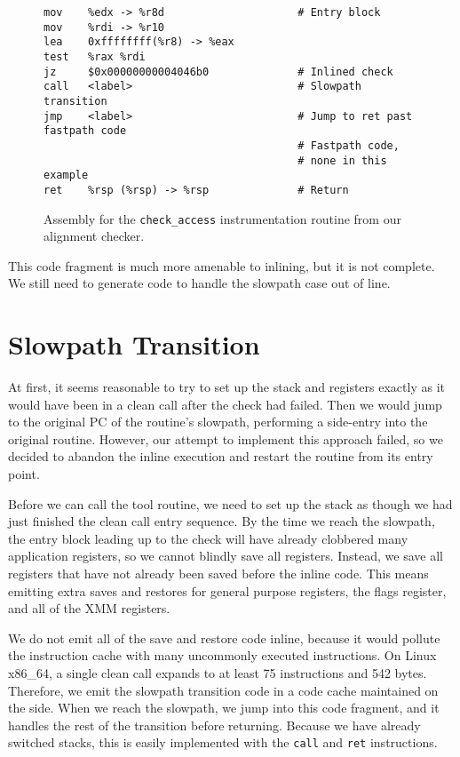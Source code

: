 \begin{figure}
\begin{verbatim}
mov    %edx -> %r8d                     # Entry block
mov    %rdi -> %r10
lea    0xffffffff(%r8) -> %eax
test   %rax %rdi
jz     $0x00000000004046b0              # Inlined check
call   <label>                          # Slowpath transition
jmp    <label>                          # Jump to ret past fastpath code
                                        # Fastpath code,
                                        # none in this example
ret    %rsp (%rsp) -> %rsp              # Return
\end{verbatim}
\caption{Assembly for the {\tt check\_access} instrumentation routine from our
alignment checker.}
\label{fig:alignment_fastpath}
\end{figure}

This code fragment is much more amenable to inlining, but it is not complete.
We still need to generate code to handle the slowpath case out of line.

\section{Slowpath Transition}
\label{sec:slowpath_transition}

At first, it seems reasonable to try to set up the stack and registers exactly
as it would have been in a clean call after the check had failed.  Then we would
jump to the original PC of the routine's slowpath, performing a side-entry into
the original routine.  However, our attempt to implement this approach failed,
so we decided to abandon the inline execution and restart the routine from its
entry point.

Before we can call the tool routine, we need to set up the stack as though we
had just finished the clean call entry sequence.  By the time we reach the
slowpath, the entry block leading up to the check will have already clobbered
many application registers, so we cannot blindly save all registers.  Instead,
we save all registers that have not already been saved before the inline code.
This means emitting extra saves and restores for general purpose registers, the
flags register, and all of the XMM registers.

We do not emit all of the save and restore code inline, because it would pollute
the instruction cache with many uncommonly executed instructions.  On Linux
x86\_64, a single clean call expands to at least 75 instructions and 542 bytes.
Therefore, we emit the slowpath transition code in a code cache maintained on
the side.  When we reach the slowpath, we jump into this code fragment, and it
handles the rest of the transition before returning.  Because we have already
switched stacks, this is easily implemented with the {\tt call} and {\tt ret}
instructions.

